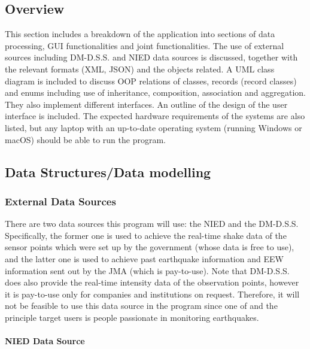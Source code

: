 \documentclass[10pt]{article}
\begin{document}
\subsection*{Overview}
This section includes a breakdown of the application into sections of data processing, GUI functionalities and joint functionalities. The use of external sources including DM-D.S.S. and NIED data sources is discussed, together with the relevant formats (XML, JSON) and the objects related. A UML class diagram is included to discuss OOP relations of classes, records (record classes) and enums including use of inheritance, composition, association and aggregation. They also implement different interfaces. An outline of the design of the user interface is included. The expected hardware requirements of the systems are also listed, but any laptop with an up-to-date operating system (running Windows or macOS) should be able to run the program.

\subsection{Data Structures/Data modelling}

\subsubsection{External Data Sources}
There are two data sources this program will use: the NIED and the DM-D.S.S. Specifically, the former one is used to achieve the real-time shake data of the sensor points which were set up by the government (whose data is free to use), and the latter one is used to achieve past earthquake information and EEW information sent out by the JMA (which is pay-to-use). Note that DM-D.S.S. does also provide the real-time intensity data of the observation points, however it is pay-to-use only for companies and institutions on request. Therefore, it will not be feasible to use this data source in the program since one of and the principle target users is people passionate in monitoring earthquakes.

\paragraph{NIED Data Source}
\end{document}
